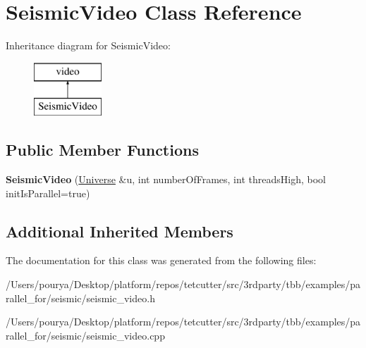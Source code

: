\hypertarget{classSeismicVideo}{}\section{Seismic\+Video Class Reference}
\label{classSeismicVideo}
Inheritance diagram for Seismic\+Video\+:\begin{figure}[H]
\begin{center}
\leavevmode
\includegraphics[height=2.000000cm]{classSeismicVideo}
\end{center}
\end{figure}
\subsection*{Public Member Functions}
\begin{DoxyCompactItemize}
\item 
\hypertarget{classSeismicVideo_a713f1960d78289e05b196da84de43143}{}{\bfseries Seismic\+Video} (\hyperlink{classUniverse}{Universe} \&u, int number\+Of\+Frames, int threads\+High, bool init\+Is\+Parallel=true)\label{classSeismicVideo_a713f1960d78289e05b196da84de43143}

\end{DoxyCompactItemize}
\subsection*{Additional Inherited Members}


The documentation for this class was generated from the following files\+:\begin{DoxyCompactItemize}
\item 
/\+Users/pourya/\+Desktop/platform/repos/tetcutter/src/3rdparty/tbb/examples/parallel\+\_\+for/seismic/seismic\+\_\+video.\+h\item 
/\+Users/pourya/\+Desktop/platform/repos/tetcutter/src/3rdparty/tbb/examples/parallel\+\_\+for/seismic/seismic\+\_\+video.\+cpp\end{DoxyCompactItemize}
